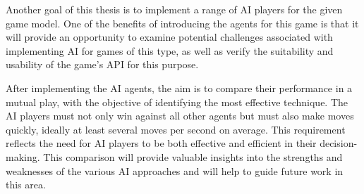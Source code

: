 Another goal of this thesis is to implement a range of AI players for the given game model. One of the benefits of introducing the agents for this game is that it will provide an opportunity to examine potential challenges associated with implementing AI for games of this type, as well as verify the suitability and usability of the game's API for this purpose.

After implementing the AI agents, the aim is to compare their performance in a mutual play, with the objective of identifying the most effective technique. The AI players must not only win against all other agents but must also make moves quickly, ideally at least several moves per second on average. This requirement reflects the need for AI players to be both effective and efficient in their decision-making. This comparison will provide valuable insights into the strengths and weaknesses of the various AI approaches and will help to guide future work in this area. 
